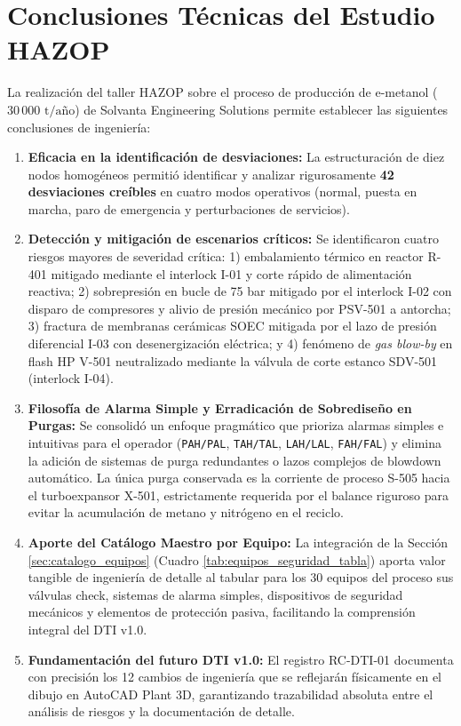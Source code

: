 \documentclass[10pt,letterpaper]{article}
\begin{document}
\section{Conclusiones Técnicas del Estudio HAZOP}
La realización del taller HAZOP sobre el proceso de producción de e-metanol ($30\,000\text{ t/año}$) de Solvanta Engineering Solutions permite establecer las siguientes conclusiones de ingeniería:
\begin{enumerate}[leftmargin=*]
    \item \textbf{Eficacia en la identificación de desviaciones:} La estructuración de diez nodos homogéneos permitió identificar y analizar rigurosamente \textbf{42 desviaciones creíbles} en cuatro modos operativos (normal, puesta en marcha, paro de emergencia y perturbaciones de servicios).
    \item \textbf{Detección y mitigación de escenarios críticos:} Se identificaron cuatro riesgos mayores de severidad crítica: 1) embalamiento térmico en reactor R-401 mitigado mediante el interlock I-01 y corte rápido de alimentación reactiva; 2) sobrepresión en bucle de 75 bar mitigado por el interlock I-02 con disparo de compresores y alivio de presión mecánico por PSV-501 a antorcha; 3) fractura de membranas cerámicas SOEC mitigada por el lazo de presión diferencial I-03 con desenergización eléctrica; y 4) fenómeno de \textit{gas blow-by} en flash HP V-501 neutralizado mediante la válvula de corte estanco SDV-501 (interlock I-04).
    \item \textbf{Filosofía de Alarma Simple y Erradicación de Sobrediseño en Purgas:} Se consolidó un enfoque pragmático que prioriza alarmas simples e intuitivas para el operador (\texttt{PAH/PAL}, \texttt{TAH/TAL}, \texttt{LAH/LAL}, \texttt{FAH/FAL}) y elimina la adición de sistemas de purga redundantes o lazos complejos de blowdown automático. La única purga conservada es la corriente de proceso S-505 hacia el turboexpansor X-501, estrictamente requerida por el balance riguroso para evitar la acumulación de metano y nitrógeno en el reciclo.
    \item \textbf{Aporte del Catálogo Maestro por Equipo:} La integración de la Sección \ref{sec:catalogo_equipos} (Cuadro \ref{tab:equipos_seguridad_tabla}) aporta valor tangible de ingeniería de detalle al tabular para los 30 equipos del proceso sus válvulas check, sistemas de alarma simples, dispositivos de seguridad mecánicos y elementos de protección pasiva, facilitando la comprensión integral del DTI v1.0.
    \item \textbf{Fundamentación del futuro DTI v1.0:} El registro RC-DTI-01 documenta con precisión los 12 cambios de ingeniería que se reflejarán físicamente en el dibujo en AutoCAD Plant 3D, garantizando trazabilidad absoluta entre el análisis de riesgos y la documentación de detalle.
\end{enumerate}
\end{document}
